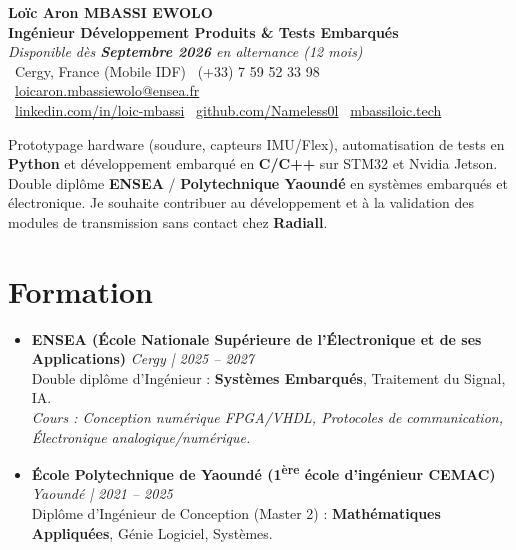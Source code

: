 \documentclass[a4paper,11pt]{article}
\begin{document}
\begin{center}
    {\Large \textbf{Loïc Aron MBASSI EWOLO}} \\ \vspace{4pt}
    \textbf{\large Ingénieur Développement Produits \& Tests Embarqués} \\
    \textit{\small Disponible dès \textbf{Septembre 2026} en alternance (12 mois)} \\ \vspace{4pt}
    \small
    \faMapMarker\ Cergy, France (Mobile IDF) \quad
    \faPhone\ (+33) 7 59 52 33 98 \quad
    \faEnvelope\ \href{mailto:loicaron.mbassiewolo@ensea.fr}{loicaron.mbassiewolo@ensea.fr} \\ \vspace{2pt}
    \faLinkedin\ \href{https://www.linkedin.com/in/loic-mbassi/}{linkedin.com/in/loic-mbassi} \quad
    \faGithub\ \href{https://github.com/Nameless0l}{github.com/Nameless0l} \quad
    \faGlobe\ \href{https://mbassiloic.tech}{mbassiloic.tech}
\end{center}

\vspace{-6pt}

\noindent\small{Prototypage hardware (soudure, capteurs IMU/Flex), automatisation de tests en \textbf{Python} et développement embarqué en \textbf{C/C++} sur STM32 et Nvidia Jetson. Double diplôme \textbf{ENSEA} / \textbf{Polytechnique Yaoundé} en systèmes embarqués et électronique. Je souhaite contribuer au développement et à la validation des modules de transmission sans contact chez \textbf{Radiall}.}

\section{Formation}
\begin{itemize}[leftmargin=*, label=\tiny$\bullet$, nosep]
    \item \textbf{ENSEA (École Nationale Supérieure de l'Électronique et de ses Applications)} \hfill \textit{Cergy | 2025 -- 2027} \\
    \small{Double diplôme d'Ingénieur : \textbf{Systèmes Embarqués}, Traitement du Signal, IA.} \\
    \textit{\small{Cours : Conception numérique FPGA/VHDL, Protocoles de communication, Électronique analogique/numérique.}}
    \vspace{2pt}
    \item \textbf{École Polytechnique de Yaoundé (1\textsuperscript{ère} école d'ingénieur CEMAC)} \hfill \textit{Yaoundé | 2021 -- 2025} \\
    \small{Diplôme d'Ingénieur de Conception (Master 2) : \textbf{Mathématiques Appliquées}, Génie Logiciel, Systèmes.}
\end{itemize}
\end{document}
